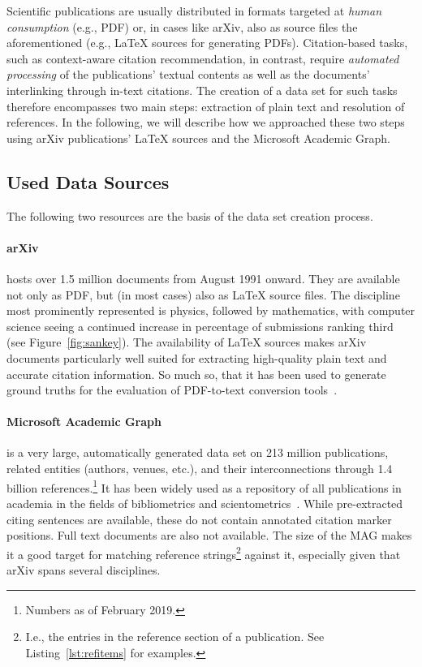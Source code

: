 Scientific publications are usually distributed in formats targeted at \emph{human consumption} (e.g., PDF) or, in cases like arXiv, also as source files the aforementioned (e.g., \LaTeX{} sources for generating PDFs). Citation-based tasks, such as context-aware citation recommendation, in contrast, require \emph{automated processing} of the publications' textual contents as well as the documents' interlinking through in-text citations. The creation of a data set for such tasks therefore encompasses two main steps: extraction of plain text and resolution of references. In the following, we will describe how we approached these two steps using arXiv publications' \LaTeX{} sources and the Microsoft Academic Graph.

\subsection{Used Data Sources}
The following two resources are the basis of the data set creation process.

\paragraph{arXiv} hosts over 1.5 million documents from August 1991 onward.%
 They are available not only as PDF, but (in most cases) also as \LaTeX{} source files. The discipline most prominently represented is physics, followed by mathematics, with computer science seeing a continued increase in percentage of submissions ranking third (see Figure~\ref{fig:sankey}). The availability of \LaTeX{} sources makes arXiv documents particularly well suited for extracting high-quality plain text and accurate citation information. So much so, that it has been used to generate ground truths for the evaluation of PDF-to-text conversion tools~\cite{Bast2017}.
\paragraph{Microsoft Academic Graph} is a very large, automatically generated data set on 213 million publications, related entities (authors, venues, etc.), and their interconnections through 1.4 billion references.\footnote{Numbers as of February 2019.} It has been widely used as a repository of all publications in academia in the fields of bibliometrics and scientometrics~\cite{Mohapatra2019}. While pre-extracted citing sentences are available, these do not contain annotated citation marker positions. Full text documents are also not available. The size of the MAG makes it a good target for matching reference strings\footnote{I.e., the entries in the reference section of a publication. See Listing~\ref{lst:refitems} for examples.} against it, especially given that arXiv spans several disciplines.

